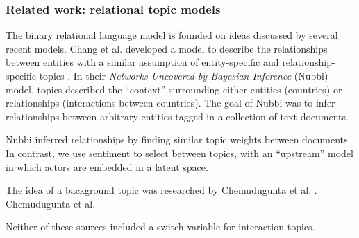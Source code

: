 \subsubsection{Related work: relational topic models}
The binary relational language model is founded on ideas discussed by
several recent models.  Chang et al. developed a model to describe the
relationships between entities with a similar assumption of
entity-specific and relationship-specific topics
\cite{chang:2009nubbi}.  In their \emph{Networks Uncovered by Bayesian
  Inference} (Nubbi) model, topics described the ``context''
surrounding either entities (countries) or relationships (interactions
between countries).  The goal of Nubbi was to infer relationships
between arbitrary entities tagged in a collection of text documents.

Nubbi inferred relationships by finding similar topic weights between
documents. In contrast, we use sentiment to select between topics,
with an ``upstream'' model in which actors are embedded in a latent
space.

The idea of a background topic was researched by
Chemudugunta et al. \cite{chemudugunta:2009}.  Chemudugunta et al. 

Neither of these sources included a switch variable for interaction topics.

